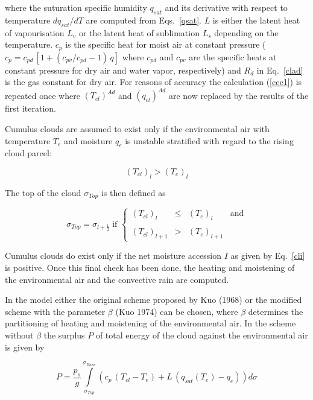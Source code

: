 where the suturation specific humidity $q_{sat}$  and
its derivative with respect to temperature 
$dq_{sat}/dT$ are computed from Eqs.~\ref{qsat}.
$L$ is
either the latent heat of vapourisation $L_v$ or
the latent heat of  sublimation $L_s$ depending on the
temperature.
$c_p$ is the specific
heat for moist air at constant pressure ($c_p= c_{pd} \,
[1+(c_{pv}/c_{pd}-1)\, q]$ where
$c_{pd}$ and $c_{pv}$ are the specific heats at
constant pressure for dry air and water vapor,
respectively) and $R_d$ in Eq.~\ref{clad} is the gas
constant for dry air.
For reasons of accuracy the calculation (\ref{ccc1}) is
repeated once where $(T_{cl})^{Ad}$
and $(q_{cl})^{Ad}$ are now replaced by the results
of the first iteration.

Cumulus clouds are assumed to exist only if the
environmental air with temperature $T_e$ and
moisture $q_e$  is unstable stratified with regard to the
rising cloud parcel:

\begin{equation}
(T_{cl})_l > (T_e)_l
\end{equation}

The top of the cloud $\sigma_{Top}$ is then defined
as 

\begin{equation}
\sigma_{Top}=\sigma_{l+\frac{1}{2}} \; \mbox{if }
\left\{ \begin{array}{lcll} (T_{cl})_l &
\le & 
(T_{e})_l & \mbox{and} \\ &&& \\ (T_{cl})_{l+1} &
> & (T_{e})_{l+1} & \end{array}
\right.
\end{equation}

Cumulus clouds do exist only if the net moisture
accession $I$ as given by Eq.~\ref{cli} is
positive.
Once this final check has been done, the heating and
moistening of the environmental air and
the
convective rain are computed. 

In the model either the original scheme  proposed by
Kuo (1968) or the modified scheme with
the parameter $\beta$ (Kuo 1974) can be chosen,
where $\beta$ determines the partitioning of
heating and moistening of the environmental air. In the
scheme without $\beta$ the surplus $P$ 
of total energy of the cloud against the environmental
air is given by

\begin{equation}
P=\frac{p_s}{g}
\int\limits_{\sigma_{Top}}^{\sigma_{Base}} (c_p\,
(T_{cl} -T_{e}) + L\,
(q_{sat}(T_e)-q_{e})) d\sigma
\end{equation} 


